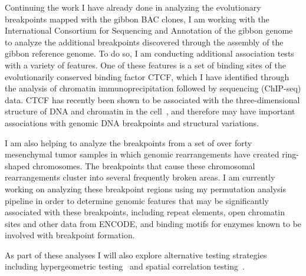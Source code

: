 Continuing the work I have already done in analyzing the evolutionary breakpoints mapped with the gibbon BAC clones, I am working with the International Consortium for Sequencing and Annotation of the gibbon genome to analyze the additional breakpoints discovered through the assembly of the gibbon reference genome. To do so, I am conducting additional association tests with a variety of features. One of these features is a set of binding sites of the evolutionarily conserved binding factor CTCF, which I have identified through the analysis of chromatin immunoprecipitation followed by sequencing (ChIP-seq) data. CTCF has recently been shown to be associated with the three-dimensional structure of DNA and chromatin in the cell~\cite{Dixon:2012gc}, and therefore may have important associations with genomic DNA breakpoints and structural variations.

I am also helping to analyze the breakpoints from a set of over forty mesenchymal tumor samples in which genomic rearrangements have created ring-shaped chromosomes. The breakpoints that cause these chromosomal rearrangements cluster into several frequently broken areas. I am currently working on analyzing these breakpoint regions using my permutation analysis pipeline in order to determine genomic features that may be significantly associated with these breakpoints, including repeat elements, open chromatin sites and other data from ENCODE, and binding motifs for enzymes known to be involved with breakpoint formation.

As part of these analyses I will also explore alternative testing strategies including hypergeometric testing~\cite{Sandve:2013ip} and spatial correlation testing~\cite{Favorov:2012dy}.
